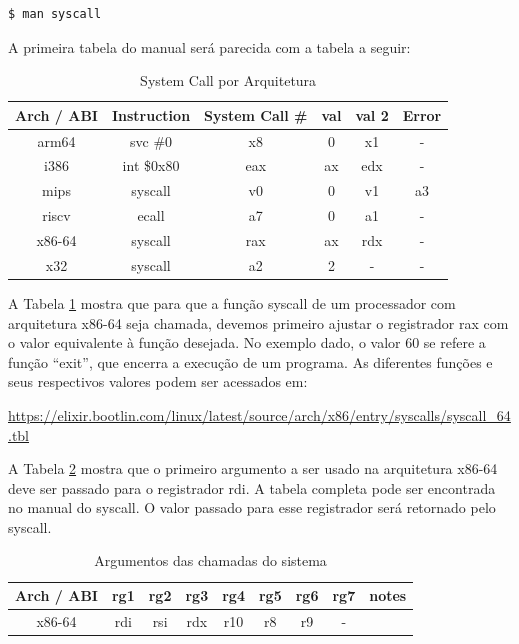 \begin{lstlisting}[language=bash]
    $ man syscall
\end{lstlisting}



A primeira tabela do manual será parecida com a tabela a seguir:




\begin{table}[h!]
\centering
\begin{tabular}{||c c c c c c||} 
 \hline
    Arch / ABI & Instruction & System Call # & val & val 2 & Error \\ [0.5ex] 
 \hline\hline
arm64 & svc \#0 & x8 & 0 & x1 & - \\
 \hline
 i386 & int \$0x80 & eax & ax & edx & - \\
 \hline
 mips & syscall & v0 & 0 & v1 & a3 \\
 \hline
 riscv & ecall & a7 & 0 & a1 & - \\
 \hline
 x86-64 & syscall & rax & ax & rdx & - \\
 \hline
 x32 & syscall & a2 & 2 & - & - \\
 \hline

\end{tabular}


 \caption{System Call por Arquitetura}
\label{tab:System Call por Arquitetura}
\end{table}


A Tabela \ref{tab:System Call por Arquitetura} mostra que para que a função syscall de um processador com
arquitetura x86-64 seja chamada, devemos primeiro ajustar o registrador
rax com o valor equivalente à função desejada. No exemplo dado, o valor
60 se refere a função ``exit'', que encerra a execução de um programa.
As diferentes funções e seus respectivos valores podem ser acessados em:

\url{https://elixir.bootlin.com/linux/latest/source/arch/x86/entry/syscalls/syscall\_64.tbl}

A Tabela \ref{tab:Argumentos das chamadas do sistema} mostra que o primeiro argumento a ser usado na arquitetura
x86-64 deve ser passado para o registrador rdi. A tabela completa pode
ser encontrada no manual do syscall. O valor passado para esse
registrador será retornado pelo syscall.



\begin{table}[h!]
\centering
\begin{tabular}{||c c c c c c c c c||} 
 \hline
    Arch / ABI & rg1 & rg2 & rg3 & rg4 & rg5 & rg6 & rg7 & notes \\ [0.5ex] 
 \hline\hline
x86-64 & rdi & rsi & rdx & r10 & r8 & r9 & - & \\

 \hline

\end{tabular}

 \caption{Argumentos das chamadas do sistema}
\label{tab:Argumentos das chamadas do sistema}
\end{table}

